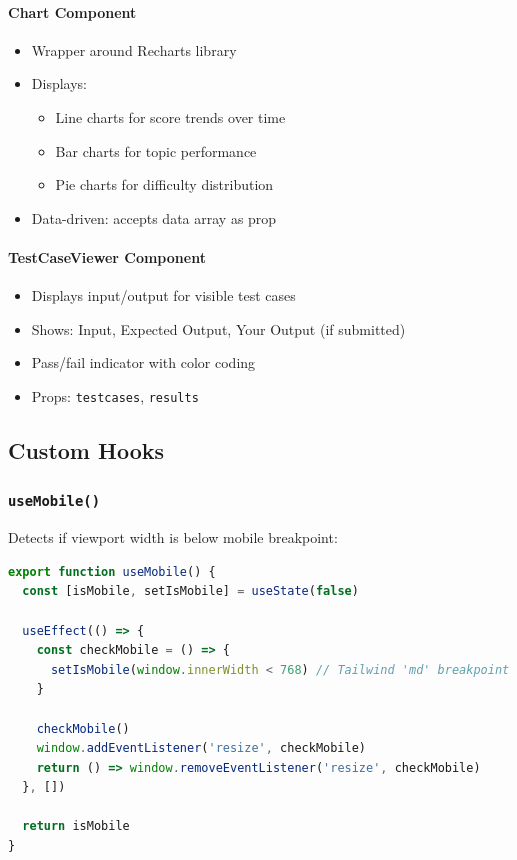 \documentclass[12pt,a4paper,oneside]{article}
\newcommand{\funcname}[1]{\texttt{\textbf{#1}}}
\newcommand{\varname}[1]{\texttt{#1}}
\begin{document}
\paragraph{Chart Component}

\begin{itemize}
    \item Wrapper around Recharts library
    \item Displays:
    \begin{itemize}
        \item Line charts for score trends over time
        \item Bar charts for topic performance
        \item Pie charts for difficulty distribution
    \end{itemize}
    \item Data-driven: accepts data array as prop
\end{itemize}

\paragraph{TestCaseViewer Component}

\begin{itemize}
    \item Displays input/output for visible test cases
    \item Shows: Input, Expected Output, Your Output (if submitted)
    \item Pass/fail indicator with color coding
    \item Props: \varname{testcases}, \varname{results}
\end{itemize}

\subsection{Custom Hooks}

\subsubsection{\funcname{useMobile()}}

Detects if viewport width is below mobile breakpoint:

\begin{lstlisting}[language=JavaScript, caption=Mobile Detection Hook]
export function useMobile() {
  const [isMobile, setIsMobile] = useState(false)
  
  useEffect(() => {
    const checkMobile = () => {
      setIsMobile(window.innerWidth < 768) // Tailwind 'md' breakpoint
    }
    
    checkMobile()
    window.addEventListener('resize', checkMobile)
    return () => window.removeEventListener('resize', checkMobile)
  }, [])
  
  return isMobile
}
\end{lstlisting}
\end{document}
